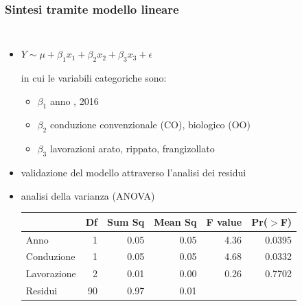 \begin{frame}
  \frametitle{Sintesi tramite modello lineare}
  \begin{columns}
    \pause
    \begin{itemize}
      \item 
      \vspace{0.25cm}
      $Y \sim \mu + \beta_1x_1 + \beta_2x_2 + \beta_3x_3 + \epsilon$
      \vspace{0.25cm}

      in cui le variabili categoriche sono:
      \begin{itemize}
        \item $\beta_1$  anno , 2016
        \item $\beta_2$ conduzione \newline convenzionale (CO), biologico (OO)
        \item $\beta_3$ lavorazioni \newline arato, rippato, frangizollato
      \end{itemize}
      \item validazione del modello attraverso l'analisi dei residui    
      \item analisi della varianza (ANOVA)
       {\begin{table}
          \centering
          \footnotesize
          \begin{tabular}{lrrrrr}
            \hline
            & Df & Sum Sq & Mean Sq & F value & Pr($>$F) \\ 
            \hline
            Anno & 1 & 0.05 & 0.05 & 4.36 & 0.0395 \\ 
            Conduzione & 1 & 0.05 & 0.05 & 4.68 & 0.0332 \\ 
            Lavorazione & 2 & 0.01 & 0.00 & 0.26 & 0.7702 \\ 
            Residui & 90 & 0.97 & 0.01 &  &  \\ 
            \hline
          \end{tabular}
          \label{tab:Anova densita campo 2015-2016}
        \end{table}}

    \end{itemize}
    
  \end{columns}
\end{frame}


